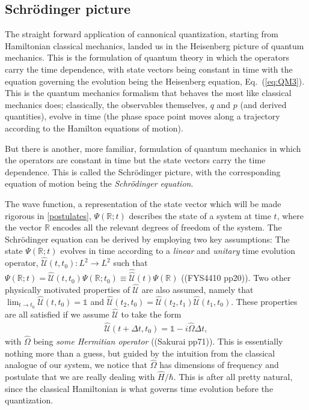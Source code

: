 \documentclass[a4paper]{article}
\newcommand{\R}{\mathbb{R}}
\newcommand{\eq} [1]{Eq.\ (\ref{eq:#1})}
\begin{document}
\subsection{Schrödinger picture}
The straight forward application of cannonical quantization, starting from Hamiltonian classical mechanics, landed us in the Heisenberg picture of quantum mechanics. This is the formulation of quantum theory in which the operators carry the time dependence, with state vectors being constant in time with the equation governing the evolution being the Heisenberg equation, \eq{QM3}. This is the quantum mechanics formalism that behaves the most like classical mechanics does; classically, the observables themselves, $q$ and $p$ (and derived quantities), evolve in time (the phase space point moves along a trajectory according to the Hamilton equations of motion).

But there is another, more familiar, formulation of quantum mechanics in which the operators are constant in time but the state vectors carry the time dependence. This is called the Schrödinger picture, with the corresponding equation of motion being the \emph{Schrödinger equation}. 

The wave function, a representation of the state vector which will be made rigorous in \ref{postulates}, $\Psi(\R;t)$ describes the state of a system at time $t$, where the vector $\R$ encodes all the relevant degrees of freedom of the system. The Schrödinger equation can be derived by employing two key assumptions: The state $\Psi(\R;t)$ evolves in time according to a \emph{linear} and \emph{unitary} time evolution operator, $\hat{\mathcal{U}}(t,t_0):L^2\rightarrow L^2$ such that $\Psi(\R;t)=\hat{\mathcal{U}}(t,t_0)\Psi(\R;t_0)\equiv \hat \hat{\mathcal{U}}(t)\Psi(\R)$ ((FYS4410 pp20)). Two other physically motivated properties of $\hat{\mathcal{U}}$ are also assumed, namely that $\lim_{t\rightarrow t_0} \hat{\mathcal{U}}(t,t_0)=\mathds{1}$ and $\hat{\mathcal{U}}(t_2,t_0)=\hat{\mathcal{U}}(t_2,t_1)\hat{\mathcal{U}}(t_1,t_0)$. These properties are all satisfied if we assume $\hat{\mathcal{U}}$  to take the form
\begin{align}
\hat{\mathcal{U}}(t+\Delta t,t_0) = \mathds{1} - i \hat \Omega \Delta t,
\end{align}
with $\hat \Omega$ being \emph{some Hermitian operator} ((Sakurai pp71)). This is essentially nothing more than a guess, but guided by the intuition from the classical analogue of our system, we notice that $\hat \Omega$ has dimensions of frequency and postulate that we are really dealing with $\hat H / \hbar$. This is after all pretty natural, since the classical Hamiltonian is what governs time evolution before the quantization. 
\end{document}
